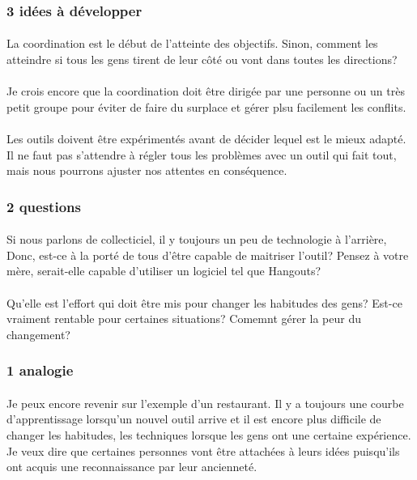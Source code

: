 \documentclass[12pt]{article}
\begin{document}
\subsubsection{3 idées à développer}
\paragraph{}
La coordination est le début de l'atteinte des objectifs. Sinon, comment les atteindre si tous les gens tirent de leur côté ou vont dans toutes les directions?

\paragraph{}
Je crois encore que la coordination doit être dirigée par une personne ou un très petit groupe pour éviter de faire du surplace et gérer plsu facilement les conflits.

\paragraph{}
Les outils doivent être expérimentés avant de décider lequel est le mieux adapté. Il ne faut pas s'attendre à régler tous les problèmes avec un outil qui fait tout, mais nous pourrons ajuster nos attentes en conséquence.

\subsubsection{2 questions}
\paragraph{}
Si nous parlons de collecticiel, il y toujours un peu de technologie à l'arrière, Donc, est-ce à la porté de tous d'être capable de maitriser l'outil? Pensez à votre mère, serait-elle capable d'utiliser un logiciel tel que Hangouts?

\paragraph{}
Qu'elle est l'effort qui doit être mis pour changer les habitudes des gens? Est-ce vraiment rentable pour certaines situations? Comemnt gérer la peur du changement?

\subsubsection{1 analogie}
\paragraph{}
Je peux encore revenir sur l'exemple d'un restaurant. Il y a toujours une courbe d'apprentissage lorsqu'un nouvel outil arrive et il est encore plus difficile de changer les habitudes, les techniques lorsque les gens ont une certaine expérience. Je veux dire que certaines personnes vont être attachées à leurs idées puisqu'ils ont acquis une reconnaissance par leur ancienneté.
\end{document}

